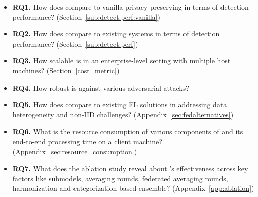


\begin{itemize}[leftmargin=*,itemsep=0.1em, parsep=0em, topsep=0em]
  \item \textbf{RQ1.} How does \Sys compare to vanilla privacy-preserving \pids in terms of detection performance? (Section~\ref{sub:detect:perf:vanilla})
  \item \textbf{RQ2.} How does \Sys compare to existing systems in terms of detection performance? (Section~\ref{sub:detect:perf})
  \item \textbf{RQ3.} How scalable is \Sys in an enterprise-level setting with multiple host machines? (Section~\ref{cost_metric})
  \item \textbf{RQ4.} How robust is \Sys against various adversarial attacks?
  \item \textbf{RQ5.} How does \Sys compare to existing FL solutions in addressing data heterogeneity and non-IID challenges? (Appendix~\ref{sec:fedalternatives})
  \item \textbf{RQ6.} What is the resource consumption of various components of \Sys and its end-to-end processing time on a client machine? (Appendix~\ref{sec:resource_consumption})
  \item \textbf{RQ7.} What does the ablation study reveal about \Sys's effectiveness across key factors like \gnnshort submodels, averaging rounds, federated averaging rounds, \wordvec harmonization and categorization-based \gnnshort ensemble? (Appendix~\ref{app:ablation})
  
  \end{itemize}  


